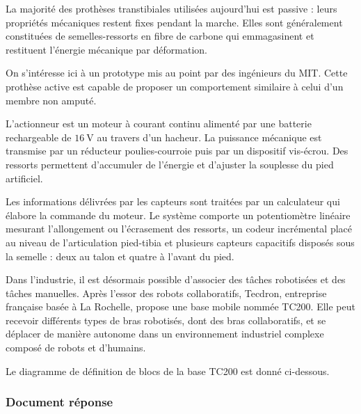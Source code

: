 La majorité des prothèses transtibiales utilisées aujourd'hui est passive :
leurs propriétés mécaniques restent fixes pendant la marche. Elles sont
généralement constituées de semelles-ressorts en fibre de carbone qui
emmagasinent et restituent l'énergie mécanique par déformation.

On s'intéresse ici à un prototype mis au point par des ingénieurs du MIT. Cette
prothèse active est capable de proposer un comportement similaire à celui d'un
membre non amputé.

L'actionneur est un moteur à courant continu alimenté par une batterie
rechargeable de $16~\mathrm{V}$ au travers d'un hacheur. La puissance mécanique
est transmise par un réducteur poulies-courroie puis par un dispositif
vis-écrou. Des ressorts permettent d'accumuler de l'énergie et d'ajuster la
souplesse du pied artificiel.


Les informations délivrées par les capteurs sont traitées par un calculateur
qui élabore la commande du moteur. Le système comporte un potentiomètre linéaire
mesurant l'allongement ou l'écrasement des ressorts, un codeur incrémental placé
au niveau de l'articulation pied-tibia et plusieurs capteurs capacitifs disposés
sous la semelle : deux au talon et quatre à l'avant du pied.




Dans l'industrie, il est désormais possible d'associer des tâches robotisées et
des tâches manuelles. Après l'essor des robots collaboratifs, Tecdron,
entreprise française basée à La Rochelle, propose une base mobile nommée TC200.
Elle peut recevoir différents types de bras robotisés, dont des bras
collaboratifs, et se déplacer de manière autonome dans un environnement
industriel complexe composé de robots et d'humains.

Le diagramme de définition de blocs de la base TC200 est donné ci-dessous.


\subsubsection*{Document réponse}

